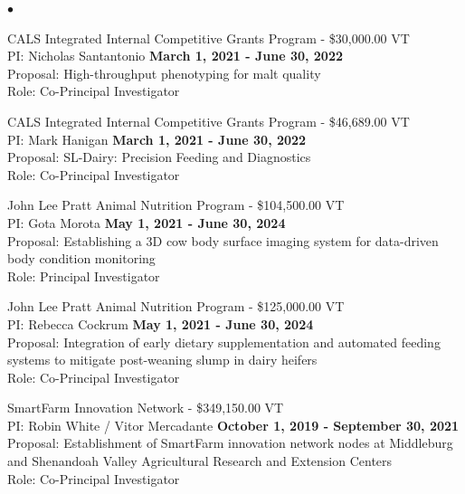 \documentclass[margin,line,10pt]{res}
\newenvironment{list2}{
  \begin{list}{$\bullet$}{%
      \setlength{\itemsep}{0in}
      \setlength{\parsep}{0in} \setlength{\parskip}{0in}
      \setlength{\topsep}{0in} \setlength{\partopsep}{0in} 
      \setlength{\leftmargin}{0.2in}}}{\end{list}}
\begin{document}
\begin{resume}
\begin{list2}
  \vspace{0.5cm}

  \item CALS Integrated Internal Competitive Grants Program  - \$30,000.00  \hfill VT\\
PI: Nicholas Santantonio \hfill \textbf{March 1, 2021 - June 30, 2022}\\
Proposal: High-throughput phenotyping for malt quality\\
Role: Co-Principal Investigator \\

\vspace{0.5cm}


 \item CALS Integrated Internal Competitive Grants Program  - \$46,689.00  \hfill VT\\
PI: Mark Hanigan \hfill \textbf{March 1, 2021 - June 30, 2022}\\
Proposal: SL-Dairy: Precision Feeding and Diagnostics\\
Role: Co-Principal Investigator \\


\vspace{0.5cm}

\item John Lee Pratt Animal Nutrition Program - \$104,500.00  \hfill VT\\
PI: Gota Morota \hfill \textbf{May 1, 2021 - June 30, 2024}\\
Proposal: Establishing a 3D cow body surface imaging system for data-driven body condition monitoring\\
Role: Principal Investigator \\


\vspace{0.5cm}


\item John Lee Pratt Animal Nutrition Program - \$125,000.00  \hfill VT\\
PI: Rebecca Cockrum \hfill \textbf{May 1, 2021 - June 30, 2024}\\
Proposal: Integration of early dietary supplementation and automated feeding systems to mitigate post-weaning slump in dairy heifers\\
Role: Co-Principal Investigator \\

\vspace{0.5cm}


\item SmartFarm Innovation Network - \$349,150.00  \hfill VT\\
PI: Robin White / Vitor Mercadante  \hfill \textbf{October 1, 2019 - September 30, 2021}\\
Proposal: Establishment of SmartFarm innovation network nodes at Middleburg and Shenandoah Valley Agricultural Research and Extension Centers \\
Role: Co-Principal Investigator \\


\end{list2}
\end{resume}
\end{document}
